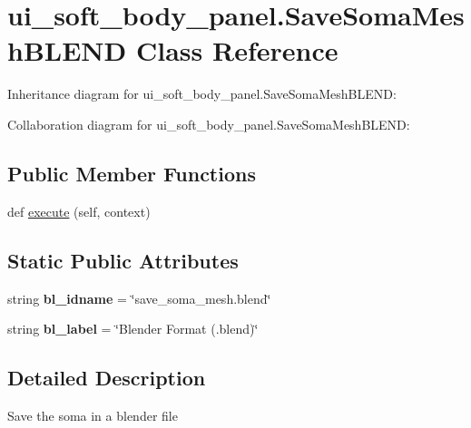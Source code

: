 \hypertarget{classui__soft__body__panel_1_1SaveSomaMeshBLEND}{}\section{ui\+\_\+soft\+\_\+body\+\_\+panel.\+Save\+Soma\+Mesh\+B\+L\+E\+ND Class Reference}
\label{classui__soft__body__panel_1_1SaveSomaMeshBLEND}


Inheritance diagram for ui\+\_\+soft\+\_\+body\+\_\+panel.\+Save\+Soma\+Mesh\+B\+L\+E\+ND\+:


Collaboration diagram for ui\+\_\+soft\+\_\+body\+\_\+panel.\+Save\+Soma\+Mesh\+B\+L\+E\+ND\+:
\subsection*{Public Member Functions}
\begin{DoxyCompactItemize}
\item 
def \hyperlink{classui__soft__body__panel_1_1SaveSomaMeshBLEND_a733fed5e7b95b3f1ece54c85170ff220}{execute} (self, context)
\end{DoxyCompactItemize}
\subsection*{Static Public Attributes}
\begin{DoxyCompactItemize}
\item 
string {\bfseries bl\+\_\+idname} = \char`\"{}save\+\_\+soma\+\_\+mesh.\+blend\char`\"{}\hypertarget{classui__soft__body__panel_1_1SaveSomaMeshBLEND_a7bea2eff038e832601b7896dbe803805}{}\label{classui__soft__body__panel_1_1SaveSomaMeshBLEND_a7bea2eff038e832601b7896dbe803805}

\item 
string {\bfseries bl\+\_\+label} = \char`\"{}Blender Format (.blend)\char`\"{}\hypertarget{classui__soft__body__panel_1_1SaveSomaMeshBLEND_a94e8f44758a56e0ca0726a13a8017ccf}{}\label{classui__soft__body__panel_1_1SaveSomaMeshBLEND_a94e8f44758a56e0ca0726a13a8017ccf}

\end{DoxyCompactItemize}


\subsection{Detailed Description}
\begin{DoxyVerb}Save the soma in a blender file\end{DoxyVerb}
 

